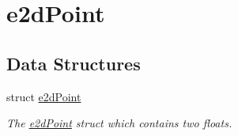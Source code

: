 \hypertarget{group__e2dPoint}{\section{e2d\-Point}
\label{group__e2dPoint}
}
\subsection*{Data Structures}
\begin{DoxyCompactItemize}
\item 
struct \hyperlink{structe2dPoint}{e2d\-Point}
\begin{DoxyCompactList}\small\item\em The \hyperlink{structe2dPoint}{e2d\-Point} struct which contains two floats. \end{DoxyCompactList}\end{DoxyCompactItemize}
